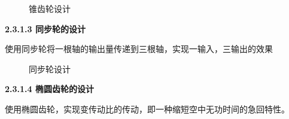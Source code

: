\documentclass[12pt]{article}
\begin{document}
\begin{CJK}{UTF8}{gbsn}
\begin{figure}[H]
\quad
\caption{锥齿轮设计}
\end{figure}
\textbf{2.3.1.3 同步轮的设计}\par
 使用同步轮将一根轴的输出量传递到三根轴，实现一输入，三输出的效果
 \begin{figure}[H]
{}
\quad
{}
\quad
\caption{同步轮设计}
\end{figure}
\textbf{2.3.1.4 椭圆齿轮的设计}\par
 使用椭圆齿轮，实现变传动比的传动，即一种缩短空中无功时间的急回特性。
 \begin{figure}[H]
{}
\end{figure}
\end{CJK}
\end{document}
